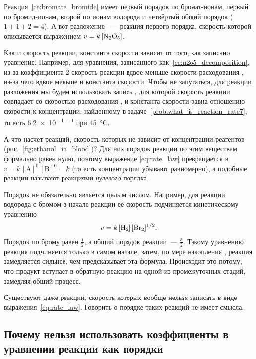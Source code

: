 Реакция~\eqref{ce:bromate_bromide} имеет первый порядок по бромат-ионам, первый по бромид-ионам, второй по ионам водорода и четвёртый общий порядок ($1 + 1 + 2 = 4$). А вот разложение ~--- реакция первого порядка, скорость которой описывается выражением $v = k\,[\ce{N2O5}]$.

Как и скорость реакции, константа скорости зависит от того, как записано уравнение. Например, для уравнения, записанного как~\eqref{ce:n2o5_decomposition}, из-за коэффициента 2 скорость реакции вдвое меньше скорости расходования , из-за чего вдвое меньше и константа скорости. Чтобы не запутаться, для реакции разложения  мы будем использовать запись , для которой скорость реакции совпадает со скоростью расходования , и константа скорости равна отношению скорости к концентрации, найденному в задаче~\ref{prob:what_is_reaction_rate7}, то есть \qty{6,2e-4}{\ruS\tothe{-1}} при \qty{45}{\degreeCelsius}.

А что насчёт реакций, скорость которых не зависит от концентрации реагентов (рис.~\ref{fig:ethanol_in_blood})? Для них порядок реакции по этим веществам формально равен нулю, поэтому выражение \eqref{eq:rate_law} превращается в $v = k\,[\mathrm{A}]^{0}\,[\mathrm{B}]^{0} = k$ (то есть концентрации убывают равномерно), а подобные реакции называют реакциями \emph{нулевого} порядка.

Порядок не обязательно является целым числом. Например, для реакции водорода с бромом
в начале реакции её скорость подчиняется кинетическому уравнению
\begin{equation*}
    v = k\,[\ce{H2}]\,[\ce{Br2}]^{1/2}.
\end{equation*}
Порядок по брому равен $\frac{1}{2}$, а общий порядок реакции~--- $\frac{3}{2}$. Такому уравнению реакция подчиняется только в самом начале, затем, по мере накопления , реакция замедляется сильнее, чем предсказывает эта формула. Происходит это потому, что продукт вступает в обратную реакцию на одной из промежуточных стадий, замедляя общий процесс.

Существуют даже реакции, скорость которых вообще нельзя записать в виде выражения~\eqref{eq:rate_law}. Говорить о порядке таких реакций не имеет смысла.

\subsection*{Почему нельзя использовать коэффициенты в уравнении реакции как порядки}

